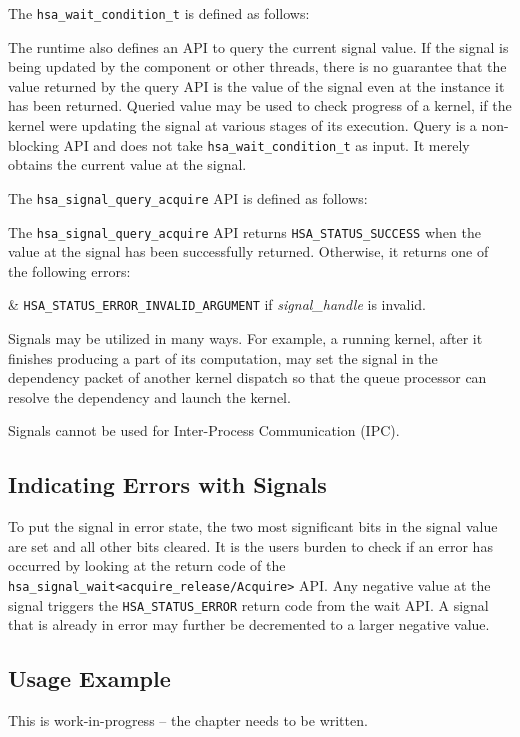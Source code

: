 \documentclass{book}
\begin{document}
The \texttt{hsa\_wait\_condition\_t} is defined as follows:



The runtime also defines an API to query the current signal value.
If the signal is being updated by the component or other threads,
there is no guarantee that the value returned by the query API is
the value of the signal even at the instance it has been returned.
Queried value may be used to check progress of a kernel, if the
kernel were updating the signal at various stages of its execution.
Query is a non-blocking API and does not take
\texttt{hsa\_wait\_condition\_t} as input. It merely obtains the
current value at the signal.

The \texttt{hsa\_signal\_query\_acquire} API is defined as follows:



The \texttt{hsa\_signal\_query\_acquire} API returns
\texttt{HSA\_STATUS\_SUCCESS} when the value at the signal has been
successfully returned. Otherwise, it returns one of the following
errors:

\begin{easylist}
& \texttt{HSA\_STATUS\_ERROR\_INVALID\_ARGUMENT} if {\itshape
signal\_handle} is invalid.
\end{easylist}

Signals may be utilized in many ways. For example, a running kernel,
after it finishes producing a part of its computation, may set the
signal in the dependency packet of another kernel dispatch so that
the queue processor can resolve the dependency and launch the kernel.

Signals cannot be used for Inter-Process Communication (IPC).

\hypertarget{signal_error}{} \subsection{ Indicating Errors with
Signals} \label{signal_error}
To put the signal in error state, the two most significant bits in
the signal value are set and all other bits cleared. It is the users
burden to check if an error has occurred by looking at the
return code of the
\texttt{hsa\_signal\_wait<acquire\_release/Acquire>} API. Any
negative value at the signal triggers the
\texttt{HSA\_STATUS\_ERROR} return code from the wait API. A signal
that is already in error may further be decremented to a larger
negative value.

\hypertarget{signal_example}{} \subsection{Usage Example}
This is {\color{red} work-in-progress} -- the chapter needs to be written.
\label{signal_example}
\end{document}
